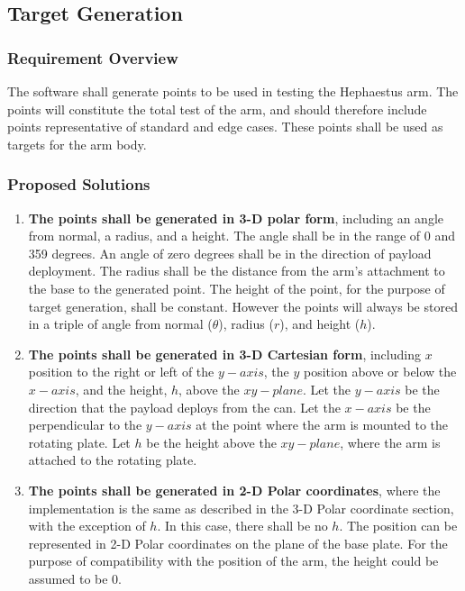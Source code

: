 \documentclass[letterpaper,10pt]{article}
\begin{document}
\subsection{Target Generation}
\subsubsection{Requirement Overview}
The software shall generate points to be used in testing the Hephaestus arm.
The points will constitute the total test of the arm, and should therefore include points
representative of standard and edge cases.
These points shall be used as targets for the arm body.
\subsubsection{Proposed Solutions}
\begin{enumerate}
\item{
\textbf{The points shall be generated in 3-D polar form}, including an angle from normal, a radius, 
and a height. 
The angle shall be in the range of 0 and 359 degrees.
An angle of zero degrees shall be in the direction of payload deployment.
The radius shall be the distance from the arm's attachment to the base to the generated point.
The height of the point, for the purpose of target generation, shall be constant.
However the points will always be stored in a triple of angle from normal (\(\theta\)), radius (\(r\)), and height (\(h\)).
}
\item{
\textbf{The points shall be generated in 3-D Cartesian form}, including \(x\) position to the right 
or left of the \(y-axis\), the \(y\) position above or below the \(x-axis\), and the height, \(h\), 
above the \(xy-plane\).
Let the \(y-axis\) be the direction that the payload deploys from the can.
Let the \(x-axis\) be the perpendicular to the \(y-axis\) at the point where the arm is mounted 
to the rotating plate. 
Let \(h\) be the height above the \(xy-plane\), where the arm is attached to the rotating plate.
}
\item{
\textbf{The points shall be generated in 2-D Polar coordinates}, where the implementation is the 
same as described in the 3-D Polar coordinate section, with the exception of \(h\).
In this case, there shall be no \(h\).
The position can be represented in 2-D Polar coordinates on the plane of the base plate.
For the purpose of compatibility with the position of the arm, the height could be assumed to be 0.
}
\end{enumerate}
\end{document}
